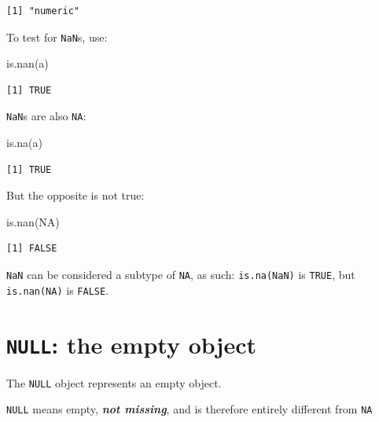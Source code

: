 \documentclass[
]{book}
\makeatletter
\newenvironment{Shaded}{\begin{snugshade}}{\end{snugshade}}
\newcommand{\ConstantTok}[1]{\textcolor[rgb]{0.00,0.00,0.00}{#1}}
\newcommand{\FunctionTok}[1]{\textcolor[rgb]{0.00,0.00,0.00}{#1}}
\newcommand{\NormalTok}[1]{#1}
\newenvironment{kframe}{%
\medskip{}
\setlength{\fboxsep}{.8em}
 \def\at@end@of@kframe{}%
 \ifinner\ifhmode%
  \def\at@end@of@kframe{\end{minipage}}%
  \begin{minipage}{\columnwidth}%
 \fi\fi%
 \def\FrameCommand##1{\hskip\@totalleftmargin \hskip-\fboxsep
 \colorbox{shadecolor}{##1}\hskip-\fboxsep
     \hskip-\linewidth \hskip-\@totalleftmargin \hskip\columnwidth}%
 \MakeFramed {\advance\hsize-\width
   \@totalleftmargin\z@ \linewidth\hsize
   \@setminipage}}%
 {\par\unskip\endMakeFramed%
 \at@end@of@kframe}
\newenvironment{rmdblock}[1]
  {
  \begin{itemize}
  \renewcommand{\labelitemi}{
    \raisebox{-.7\height}[0pt][0pt]{
      {\setkeys{Gin}{width=3em,keepaspectratio}\texttt{[image: images/\#1]}}
    }
  }
  \setlength{\fboxsep}{1em}
  \begin{kframe}
  \item
  }
  {
  \end{kframe}
  \end{itemize}
  }
\newenvironment{note}
  {\begin{rmdblock}{note}}
  {\end{rmdblock}}
\makeatother
\begin{document}
\begin{verbatim}
[1] "numeric"
\end{verbatim}

To test for \texttt{NaN}s, use:

\begin{Shaded}
\begin{Highlighting}[]
\FunctionTok{is.nan}\NormalTok{(a)}
\end{Highlighting}
\end{Shaded}

\begin{verbatim}
[1] TRUE
\end{verbatim}

\texttt{NaN}s are also \texttt{NA}:

\begin{Shaded}
\begin{Highlighting}[]
\FunctionTok{is.na}\NormalTok{(a)}
\end{Highlighting}
\end{Shaded}

\begin{verbatim}
[1] TRUE
\end{verbatim}

But the opposite is not true:

\begin{Shaded}
\begin{Highlighting}[]
\FunctionTok{is.nan}\NormalTok{(}\ConstantTok{NA}\NormalTok{)}
\end{Highlighting}
\end{Shaded}

\begin{verbatim}
[1] FALSE
\end{verbatim}

\begin{note}
\texttt{NaN} can be considered a subtype of \texttt{NA}, as such:
\texttt{is.na(NaN)} is \texttt{TRUE}, but \texttt{is.nan(NA)} is
\texttt{FALSE}.
\end{note}

\hypertarget{null-the-empty-object}{%
\section{\texorpdfstring{\texttt{NULL}: the empty object}{NULL: the empty object}}\label{null-the-empty-object}}

The \texttt{NULL} object represents an empty object.

\begin{note}
\texttt{NULL} means empty, \textbf{\emph{not missing}}, and is therefore
entirely different from \texttt{NA}
\end{note}
\end{document}
